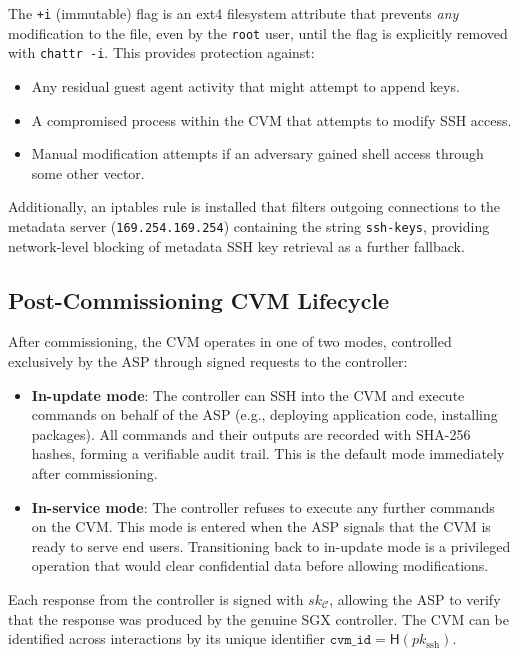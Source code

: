 The \texttt{+i} (immutable) flag is an ext4 filesystem attribute that prevents \emph{any} modification to the file, even by the \texttt{root} user, until the flag is explicitly removed with \texttt{chattr -i}. This provides protection against:

\begin{itemize}
    \item Any residual guest agent activity that might attempt to append keys.
    \item A compromised process within the CVM that attempts to modify SSH access.
    \item Manual modification attempts if an adversary gained shell access through some other vector.
\end{itemize}

\noindent Additionally, an iptables rule is installed that filters outgoing connections to the metadata server (\texttt{169.254.169.254}) containing the string \texttt{ssh-keys}, providing network-level blocking of metadata SSH key retrieval as a further fallback.

\subsection{Post-Commissioning CVM Lifecycle}
\label{sec:commissioning:lifecycle}

After commissioning, the CVM operates in one of two modes, controlled exclusively by the ASP through signed requests to the controller:

\begin{itemize}
    \item \textbf{In-update mode}: The controller can SSH into the CVM and execute commands on behalf of the ASP (e.g., deploying application code, installing packages). All commands and their outputs are recorded with SHA-256 hashes, forming a verifiable audit trail. This is the default mode immediately after commissioning.
    \item \textbf{In-service mode}: The controller refuses to execute any further commands on the CVM. This mode is entered when the ASP signals that the CVM is ready to serve end users. Transitioning back to in-update mode is a privileged operation that would clear confidential data before allowing modifications.
\end{itemize}

Each response from the controller is signed with $sk_\mathcal{C}$, allowing the ASP to verify that the response was produced by the genuine SGX controller. The CVM can be identified across interactions by its unique identifier $\texttt{cvm\_id} = \textsf{H}(pk_{\text{ssh}})$.


